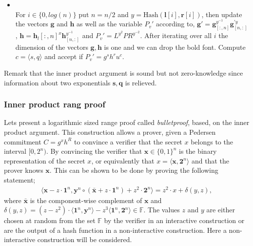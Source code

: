 \begin{algorithm}
\begin{itemize}
\begin{itemize}
\end{itemize}
\item{}\\
For $i\in\{0,log(n)\}$ put $n=n/2$ and $y=\text{Hash}(\bm{l}[i],\bm{r}[i])$, then update the vectors $\bm{g}$ and $\bm{h}$ as well as the  variable $P_v'$ according to, $\bm{g}'= \bm{g}_{[:,n]}^{y^{-1}} \bm{g}_{[n,:]}^{'y}$, $\bm{h}= \bm{h}_l{[:,n]}^{x}\bm{h}_{[n,:]}^{y^{-1}}$ and $ P_v' = L^{y^2}PR^{y^{-2}}  $. After iterating over all $i$ the dimension of the vectors $\bm{g},\bm{h}$ is one and we can drop the bold font. Compute  $c=\langle s, q\rangle$ and  accept if $P_v' =g^sh^ru^c$.
\end{itemize}
\label{alg:inner_product}
\end{algorithm}




 
Remark that the inner product argument is sound but not zero-knowledge since information about two exponentials $\mathbf{s},\mathbf{q}$ is relieved.

\subsubsection*{Inner product rang proof}
Lets present a logarithmic sized range proof called \textit{bulletproof}, based, on the inner product argument. This construction allows a prover, given a Pedersen commitment $C=g^x h^R$ to convince a verifier that the secret $x$ belongs to the interval $[0,2^n)$. By convincing the verifier that  $\bm{x}\in\{0,1\}^n$ is the binary representation of the secret $x$, or equivalently that $x= \langle \bm{x},\mathbf{2}^n\rangle $ and that the prover knows $\bm{x}$.
This can be shown to be done by proving the following statement;
\begin{align}
    \big\langle \bm{x} -z\cdot \bm{1}^n, \bm{y}^n\circ (\bm{\bar{x}} + z \cdot\bm{1}^n) + z^2\cdot\bm{2}^n \big\rangle = z^2\cdot x+ \delta(y,z),
    \label{eq:range_non_zero}
\end{align}
where $\bar{\bm{x}}$ is the component-wise complement of $\bm{x}$ and $\delta(y,z) = (z-z^2)\cdot\langle\bm{1}^n,\bm{y}^n\rangle-z^3\langle \bm{1}^n,\bm{2}^n\rangle\in\mathds{F}$.
The values $z$ and $y$ are either chosen at random from the set $\mathds{F}$ by the verifier in an interactive construction or are the output of a hash function in a non-interactive construction. Here a non-interactive construction will be considered. 

